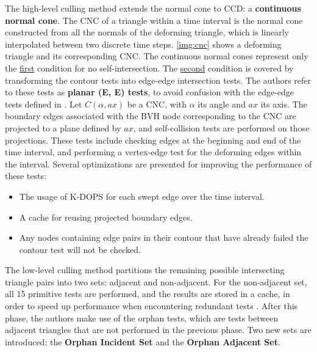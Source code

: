 
\FloatBarrier

The high-level culling method extends the normal cone to CCD: a \textbf{continuous normal cone}. The CNC of a triangle within a time interval is the normal cone constructed from all the normals of the deforming triangle, which is linearly interpolated between two discrete time steps. \autoref{img:cnc} shows a deforming triangle and its corresponding CNC. The continuous normal cones represent only the \hyperref[prop:sc1]{first} condition for no self-intersection. The \hyperref[prop:sc2]{second} condition is covered by transforming the contour tests into edge-edge intersection tests. The authors refer to these tests as \textbf{planar (E, E) tests}, to avoid confusion with the edge-edge tests defined in \citep{provot97}. Let $C(\alpha, ax)$ be a CNC, with $\alpha$ its angle and $ax$ its axis. The boundary edges associated with the BVH node corresponding to the CNC are projected to a plane defined by $ax$, and self-collision tests are performed on those projections. These tests include checking edges at the beginning and end of the time interval, and performing a vertex-edge test for the deforming edges within the interval. Several optimizations are presented for improving the performance of these tests:

\begin{itemize}
	\item The usage of K-DOPS for each swept edge over the time interval.
	\item A cache for reusing projected boundary edges.
	\item Any nodes containing edge pairs in their contour that have already failed the contour test will not be checked.
\end{itemize}

The low-level culling method partitions the remaining possible intersecting triangle pairs into two sets: adjacent and non-adjacent. For the non-adjacent set, all 15 primitive tests are performed, and the results are stored in a cache, in order to speed up performance when encountering redundant tests \citep{tang08}. After this phase, the authors make use of the orphan tests, which are tests between adjacent triangles that are not performed in the previous phase. Two new sets are introduced: the \textbf{Orphan Incident Set} and the \textbf{Orphan Adjacent Set}.

